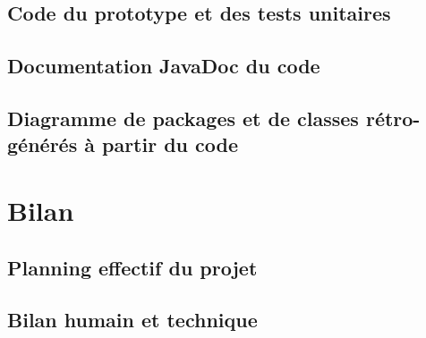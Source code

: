 \documentclass[10pt,a4paper]{book}
\begin{document}
\section{Code du prototype et des tests unitaires}
\section{Documentation JavaDoc du code}
\section{Diagramme de packages et de classes rétro-générés à partir du code}
\chapter{Bilan}
\section{Planning effectif du projet}
\section{Bilan humain et technique}
\end{document}
